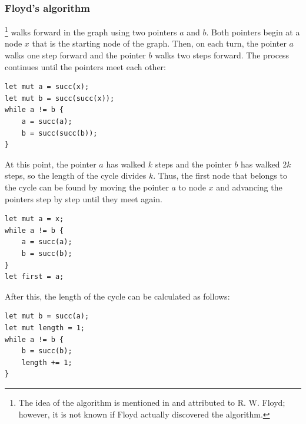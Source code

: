 \subsubsection{Floyd's algorithm}


\footnote{The idea of the algorithm is mentioned in \cite{knu982}
and attributed to R. W. Floyd; however, it is not known if Floyd actually
discovered the algorithm.} walks forward 
in the graph using two pointers $a$ and $b$.
Both pointers begin at a node $x$ that
is the starting node of the graph.
Then, on each turn, the pointer $a$ walks
one step forward and the pointer $b$
walks two steps forward.
The process continues until
the pointers meet each other:
\begin{lstlisting}
let mut a = succ(x);
let mut b = succ(succ(x));
while a != b {
    a = succ(a);
    b = succ(succ(b));
}
\end{lstlisting}

At this point, the pointer $a$ has walked $k$ steps
and the pointer $b$ has walked $2k$ steps,
so the length of the cycle divides $k$.
Thus, the first node that belongs to the cycle
can be found by moving the pointer $a$ to node $x$
and advancing the pointers
step by step until they meet again.
\begin{lstlisting}
let mut a = x;
while a != b {
    a = succ(a);
    b = succ(b);
}
let first = a;
\end{lstlisting}

After this, the length of the cycle
can be calculated as follows:
\begin{lstlisting}
let mut b = succ(a);
let mut length = 1;
while a != b {
    b = succ(b);
    length += 1;
}
\end{lstlisting}
